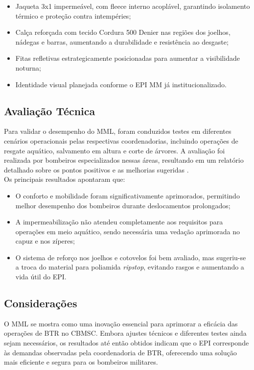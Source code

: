 \begin{itemize}
    \item Jaqueta 3x1 impermeável, com fleece interno acoplável, garantindo isolamento térmico e proteção contra intempéries;
    \item Calça reforçada com tecido Cordura 500 Denier nas regiões dos joelhos, nádegas e barras, aumentando a durabilidade e resistência ao desgaste;
    \item Fitas refletivas estrategicamente posicionadas para aumentar a visibilidade noturna;
    \item Identidade visual planejada conforme o \acrshort{EPI} \acrlong{MM} já institucionalizado.
\end{itemize}


\subsection{Avaliação Técnica}

Para validar o desempenho do \acrlong{MML}, foram conduzidos testes em diferentes cenários operacionais pelas respectivas coordenadorias, incluindo operações de resgate aquático, salvamento em altura e corte de árvores. A avaliação foi realizada por bombeiros especializados nessas áreas, resultando em um relatório detalhado sobre os pontos positivos e as melhorias sugeridas \cite{relMML}.
\\
Os principais resultados apontaram que:
\begin{itemize}
    \item O conforto e mobilidade foram significativamente aprimorados, permitindo melhor desempenho dos bombeiros durante deslocamentos prolongados;
    \item A impermeabilização não atendeu completamente aos requisitos para operações em meio aquático, sendo necessária uma vedação aprimorada no capuz e nos zíperes;
    \item O sistema de reforço nos joelhos e cotovelos foi bem avaliado, mas sugeriu-se a troca do material para poliamida \textit{ripstop}, evitando rasgos e aumentando a vida útil do \acrshort{EPI}.
\end{itemize}

    

\subsection{Considerações}
O \acrlong{MML} se mostra como uma inovação essencial para aprimorar a eficácia das operações de \acrlong{BTR} no \acrshort{CBMSC}. Embora ajustes técnicos e diferentes testes ainda sejam necessários, os resultados até então obtidos indicam que o \acrshort{EPI} corresponde às demandas observadas pela coordenadoria de \acrshort{BTR}, oferecendo uma solução mais eficiente e segura para os bombeiros militares.